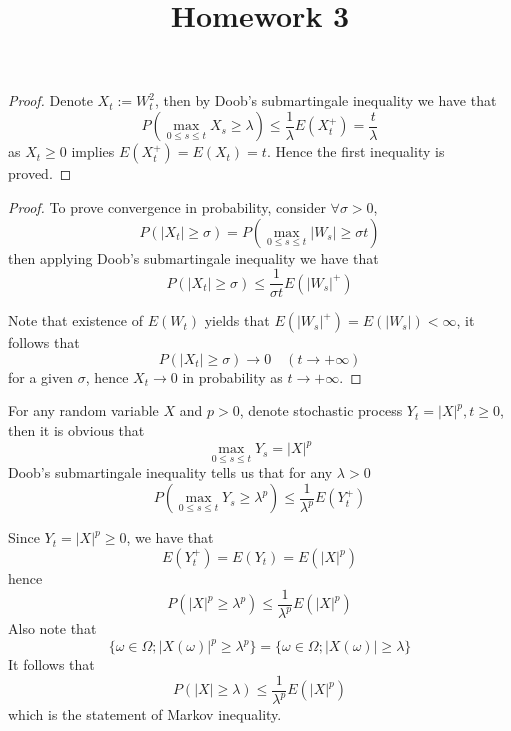 \documentclass{homework}
\title{Homework 3}
\begin{document}
    \maketitle

    \problem
    \begin{proof}
        Denote $X_t:=W_t^2$, then by Doob's submartingale inequality
        we have that
        \[P\left(\max_{0\leq s\leq t}X_s\geq\lambda\right)
        \leq\frac{1}{\lambda}E(X_t^+)=\frac{t}{\lambda}\]
        as $X_t\geq 0$ implies $E(X_t^+)=E(X_t)=t$. Hence the
        first inequality is proved.
    \end{proof}

    \problem
    \begin{proof}
        To prove convergence in probability, consider
        $\forall\sigma>0$,
        \[P(|X_t|\geq\sigma)
        =P\left(\max_{0\leq s\leq t}|W_s|\geq\sigma t\right)\]
        then applying Doob's submartingale inequality we have that
        \[P(|X_t|\geq\sigma)\leq\frac{1}{\sigma t}E(|W_s|^+)\]

        Note that existence of $E(W_t)$ yields that
        $E(|W_s|^+)=E(|W_s|)<\infty$, it follows that
        \[P(|X_t|\geq\sigma)\to 0\quad (t\to +\infty)\]
        for a given $\sigma$, hence $X_t\to 0$ in probability
        as $t\to +\infty$.
    \end{proof}

    \problem
    For any random variable $X$ and $p>0$, denote stochastic process
    $Y_t=|X|^p,t\geq 0$,
    then it is obvious that
    \[\max_{0\leq s\leq t}Y_s=|X|^p\]
    Doob's submartingale inequality tells us that
    for any $\lambda>0$
    \[P\left(\max_{0\leq s\leq t}Y_s\geq\lambda^p\right)
    \leq\frac{1}{\lambda^p}E(Y_t^+)\]

    Since $Y_t=|X|^p\geq 0$, we have that
    \[E(Y_t^+)=E(Y_t)=E(|X|^p)\]
    hence
    \[P(|X|^p\geq\lambda^p)\leq\frac{1}{\lambda^p}E(|X|^p)\]
    Also note that
    \[\{\omega\in\Omega;|X(\omega)|^p\geq\lambda^p\}
    =\{\omega\in\Omega;|X(\omega)|\geq\lambda\}\]
    It follows that
    \[P(|X|\geq\lambda)\leq\frac{1}{\lambda^p}E(|X|^p)\]
    which is the statement of Markov inequality.
\end{document}
